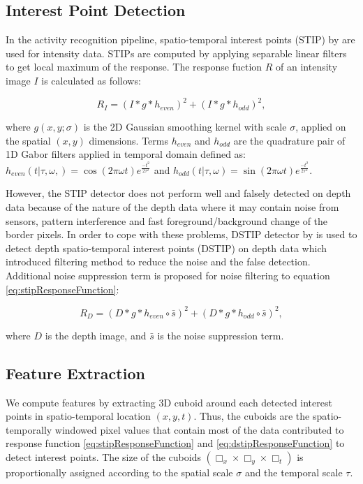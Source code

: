\subsection{Interest Point Detection}
\label{section:InterestPointDetection}
	In the activity recognition pipeline, spatio-temporal interest points (STIP) by \citet{1570899} are used for intensity data. STIPs are computed by applying separable linear filters to get local maximum of the response. The response fuction $R$ of an intensity image $I$ is calculated as follows:

\begin{equation}
R_{I} = \left(I * g * h_{even}\right)^{2} + \left(I * g * h_{odd}\right)^{2},
\label{eq:stipResponseFunction}
\end{equation}

	where $g(x, y; \sigma)$ is the 2D Gaussian smoothing kernel with scale $\sigma$, applied on the spatial $\left(x, y\right)$ dimensions. Terms $h_{even}$ and $h_{odd}$ are the quadrature pair of 1D Gabor filters applied in temporal domain defined as: $h_{even}\left(t|\tau,\omega,\right)=\cos\left(2\pi\omega t\right)e^{\frac{-t^{2}}{2\tau^{2}}}$ and $h_{odd}\left(t|\tau,\omega\right)=\sin\left(2\pi\omega t\right)e^{\frac{-t^{2}}{2\tau^{2}}}$.
    
    However, the STIP detector does not perform well and falsely detected on depth data because of the nature of the depth data where it may contain noise from sensors, pattern interference and fast foreground/background change of the border pixels. In order to cope with these problems, DSTIP detector by \citet{6619209} is used to detect depth spatio-temporal interest points (DSTIP) on depth data which introduced filtering method to reduce the noise and the false detection. Additional noise suppression term is proposed for noise filtering to equation \ref{eq:stipResponseFunction}:

\begin{equation}
R_{D} = \left(D * g * h_{even}\circ\bar{s}\right)^{2}+\left(D * g * h_{odd}\circ\bar{s}\right)^{2},
\label{eq:dstipResponseFunction}
\end{equation}

where $D$ is the depth image, and $\bar{s}$ is the noise suppression term.


\subsection{Feature Extraction}
\label{section:FeatureExtraction}
We compute features by extracting 3D cuboid around each detected interest points in spatio-temporal location $\left(x, y, t\right)$. Thus, the cuboids are the spatio-temporally windowed pixel values that contain most of the data contributed to response function \ref{eq:stipResponseFunction} and \ref{eq:dstipResponseFunction} to detect interest points. The size of the cuboids $\left(\Box_{x}\times\Box_{y}\times\Box_{t}\right)$ is proportionally assigned according to the spatial scale $\sigma$ and the temporal scale $\tau$.

